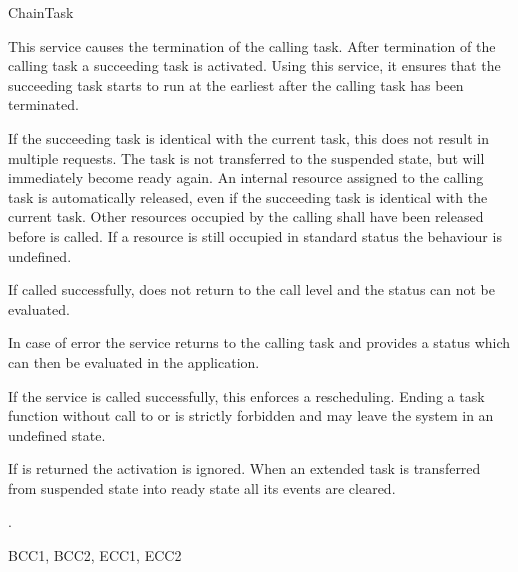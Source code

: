 \documentclass[12pt,a4paper,titlepage]{scrreprt}
\begin{document}
\begin{function}{ChainTask}


  \begin{fundescription}
This service causes the termination of the calling task. After
termination of the calling task a succeeding task  is
activated. Using this service, it ensures that the succeeding task
starts to run at the earliest after the calling task has been
terminated.

If the succeeding task is identical with the current task, this does
not result in multiple requests. The task is not transferred to the
suspended state, but will immediately become ready again.  An internal
resource assigned to the calling task is automatically released, even
if the succeeding task is identical with the current task. Other
resources occupied by the calling shall have been released before
 is called. If a resource is still occupied in standard
status the behaviour is undefined.

If called successfully,  does not return to the call level
and the status can not be evaluated.

In case of error the service returns to the calling task and provides
a status which can then be evaluated in the application.

If the service  is called successfully, this enforces a
rescheduling.  Ending a task function without call to
 or  is strictly forbidden and may
leave the system in an undefined state.

If  is returned the activation is ignored.  When an extended
task is transferred from suspended state into ready state all its
events are cleared.
  \end{fundescription}

  \begin{funparameters}
  \end{funparameters}

  \begin{funreturn}
  .
  \end{funreturn}

  \begin{funconformance}
    BCC1, BCC2, ECC1, ECC2
  \end{funconformance}
\end{function}

\end{document}
